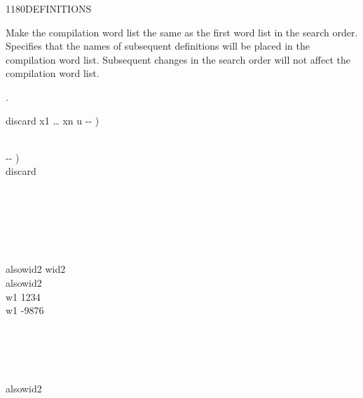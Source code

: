 \begin{worddef}{1180}{DEFINITIONS}
\item \stack{}{}

	Make the compilation word list the same as the first word list
	in the search order. Specifies that the names of subsequent
	definitions will be placed in the compilation word list.
	Subsequent changes in the search order will not affect the
	compilation word list.

\see {}.

	\begin{implement}
		\word{:} discard  x1 {\ldots} xn u -{}- ) \bs{}  \\
		    \\
		\word{;}

		\word{:}   -{}- ) \\
		\tab {}    discard \\
		\word{;}
	\end{implement}

	\begin{testing}\ttfamily
		 \\

		 \\
		 \\
		 \\

		\word{:} alsowid2   wid2      \word{;} \\
		alsowid2 \\
		\word{:} w1 1234 \word{;} \\
		\word{:} w1 -9876 \word{;} 

		  \\
		 \\
		 \\
		 \\
		alsowid2 \\
		 \\


\end{testing}
\end{worddef}

